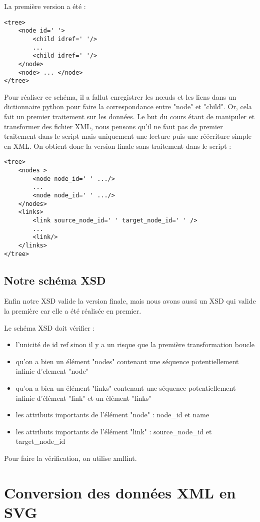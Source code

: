 \documentclass{article}
\begin{document}
La première version a été :
\begin{lstlisting}
<tree>
	<node id=' '>
		<child idref=' '/>
		...
		<child idref=' '/>
	</node>
	<node> ... </node>
</tree>
\end{lstlisting} 
Pour réaliser ce schéma, il a fallut enregistrer les nœuds et les liens dans un dictionnaire python pour faire la correspondance entre "node" et "child". 
Or, cela fait un premier traitement sur les données. Le but du cours étant de manipuler et transformer des fichier XML, nous pensons qu'il ne faut pas de premier traitement dans le script mais uniquement une lecture puis une réécriture simple en XML. 
On obtient donc la version finale sans traitement dans le script :
\begin{lstlisting}
<tree>
	<nodes >
		<node node_id=' ' .../>
		...
		<node node_id=' ' .../>
	</nodes>
	<links>
		<link source_node_id=' ' target_node_id=' ' />
		...
		<link/>
	</links>
</tree>
\end{lstlisting} 

\subsection{Notre schéma XSD}

Enfin notre XSD valide la version finale, mais nous avons aussi un XSD qui valide la première car elle a été réalisée en premier.

Le schéma XSD doit vérifier :
\begin{itemize}
\item l'unicité de id ref sinon il y a un risque que la première transformation boucle 
\item qu'on a bien un élément "nodes" contenant une séquence potentiellement infinie d'element "node" 
\item qu'on a bien un élément "links" contenant une séquence potentiellement infinie d'élément "link" 
et un élément "links" 
\item les attributs importants de l’élément "node" : node\_id et name
\item les attributs importants de l’élément "link" : source\_node\_id et target\_node\_id

\end{itemize}
 Pour faire la vérification, on utilise xmllint.


\section{Conversion des données XML en SVG}
\end{document}
